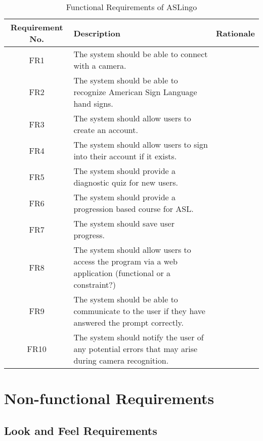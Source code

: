 \documentclass[12pt, titlepage]{article}
\begin{document}
\begin{table}[H]
\caption{Functional Requirements of ASLingo}
\noindent \begin{tabular}{| c | p{4cm}| p{5cm}|}
\toprule 
\textbf{Requirement No.} & \textbf{Description} &\textbf{Rationale}\\
\midrule
FR1 & The system should be able to connect with a camera. & \\
\hline
FR2 & The system should be able to recognize American Sign Language hand signs. & \\
\hline
FR3 & The system should allow users to create an account. & \\
\hline
FR4 & The system should allow users to sign into their account if it exists. & \\
\hline
FR5 & The system should provide a diagnostic quiz for new users. & \\
\hline
FR6 & The system should provide a progression based course for ASL. & \\
\hline
FR7 & The system should save user progress. & \\
\hline
FR8 & The system should allow users to access the program via a web application (functional or a constraint?) & \\
\hline
FR9 & The system should be able to communicate to the user if they have answered the prompt correctly. & \\ 
\hline
FR10 & The system should notify the user of any potential errors that may arise during camera recognition. & \\
\bottomrule
\end{tabular}
\end{table}

\section{Non-functional Requirements}

\subsection{Look and Feel Requirements}
\end{document}
